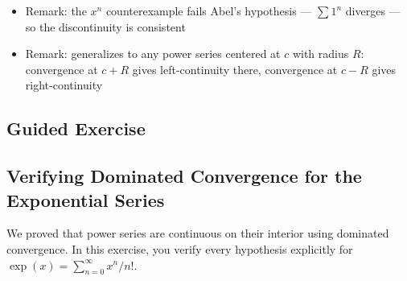 \documentclass[
  10pt,
  letterpaper,
]{scrbook}
\providecommand{\tightlist}{%
  \setlength{\itemsep}{0pt}\setlength{\parskip}{0pt}}
\begin{document}
\begin{itemize}
  \begin{itemize}
  \tightlist
  \item
    Write \(S_N = \sum_{n=0}^{N} a_n\) (partial sums, \(S_N \to S\))
  \item
    Summation by parts:
    \(\sum_{n=0}^{N} a_n x^n = S_N x^N + (1 - x) \sum_{n=0}^{N-1} S_n x^n\)
  \item
    Let \(N \to \infty\): since \(|x| < 1\), \(S_N x^N \to 0\), so
    \(f(x) = (1 - x) \sum_{n=0}^{\infty} S_n x^n\)
  \item
    Write \(S_n = S + \varepsilon_n\) where \(\varepsilon_n \to 0\)
  \item
    Then
    \(f(x) = S \cdot (1 - x) \sum x^n + (1 - x) \sum \varepsilon_n x^n = S + (1 - x) \sum \varepsilon_n x^n\)
  \item
    Show \((1 - x) \sum \varepsilon_n x^n \to 0\) as \(x \to 1^-\):
    split at a threshold \(N\) where \(|\varepsilon_n| < \varepsilon\);
    the tail is bounded by \(\varepsilon\), the head vanishes because of
    the \((1-x)\) factor
  \end{itemize}
\item
  Remark: the \(x^n\) counterexample fails Abel's hypothesis ---
  \(\sum 1^n\) diverges --- so the discontinuity is consistent
\item
  Remark: generalizes to any power series centered at \(c\) with radius
  \(R\): convergence at \(c + R\) gives left-continuity there,
  convergence at \(c - R\) gives right-continuity
\end{itemize}

\subsection{Guided Exercise}\label{guided-exercise-12}

\subsection{Verifying Dominated Convergence for the Exponential
Series}\label{verifying-dominated-convergence-for-the-exponential-series}

We proved that power series are continuous on their interior using
dominated convergence. In this exercise, you verify every hypothesis
explicitly for \(\exp(x) = \sum_{n=0}^{\infty} x^n / n!\).
\end{document}
